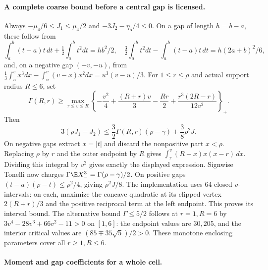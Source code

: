 \paragraph{A complete coarse bound before a central gap is licensed.}
Always $-\mu_4/6\le J_1\le\mu_4/2$ and
$-3J_2-\eta_5/4\le0$. On a gap of length $h=b-a$, these follow from
\[
 \int_a^b(t-a)t\,dt+\tfrac12\int_a^bt^2dt=hb^2/2,\quad
 \tfrac32\int_a^bt^2dt-\int_a^b(t-a)t\,dt=h(2a+b)^2/6,
\]
and, on a negative gap $(-v,-u)$, from
$\tfrac13\int_u^v x^3dx-\int_u^v(v-x)x^2dx=u^3(v-u)/3$.
For $1\le r\le\rho$ and actual support radius $R\le6$, set
\[
 \Gamma(R,r)\ge\max_{r\le v\le R}
 \left\{-\frac{v^2}4+\frac{(R+r)v}3-\frac{Rr}2+
                      \frac{r^3(2R-r)}{12v^2}\right\}_+.
\]
Then
\[
 3(\rho J_1-J_2)\le\frac32\Gamma(R,r)(\rho-\gamma)
                              +\frac38\rho^2J.
\]
On negative gaps extract $x=|t|$ and discard the nonpositive part
$x<\rho$. Replacing $\rho$ by $r$ and the outer endpoint by $R$
gives $\int_r^v(R-x)x(x-r)\,dx$. Dividing this integral by $v^2$
gives exactly the displayed expression. Signwise Tonelli now charges
$\Gamma\E X_-^3=\Gamma(\rho-\gamma)/2$.
On positive gaps $(t-a)(\rho-t)\le\rho^2/4$, giving $\rho^2J/8$.
The implementation uses 64 closed $v$-intervals: on each, maximize the
concave quadratic at its clipped vertex $2(R+r)/3$ and the positive
reciprocal term at the left endpoint. This proves its interval bound.
The alternative bound $\Gamma\le5/2$ follows at $r=1,R=6$ by
$3v^4-28v^3+66v^2-11>0$ on $[1,6]$: the endpoint values are $30,205$,
and the interior critical values are $(85\mp35\sqrt5)/2>0$.
These monotone enclosing parameters cover all $r\ge1,R\le6$.
\paragraph{Moment and gap coefficients for a whole cell.}
\label{j:local:mom:conditional-boxes}

